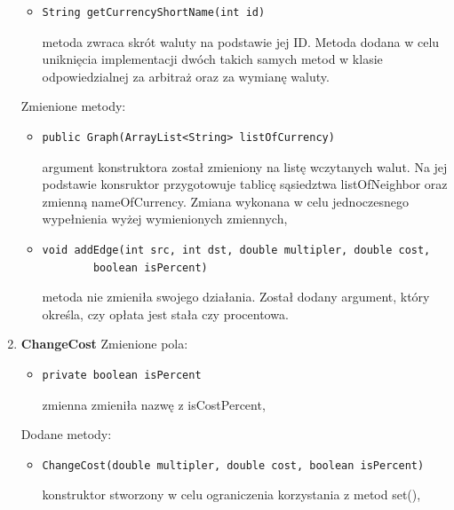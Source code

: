 \documentclass[12pt]{article}
\begin{document}
\begin{enumerate}
\begin{itemize}
    \end{itemize}
    \begin{itemize}
        \item \begin{verbatim}String getCurrencyShortName(int id)\end{verbatim}
        metoda zwraca skrót waluty na podstawie jej ID. Metoda dodana w celu uniknięcia implementacji dwóch takich samych metod w klasie odpowiedzialnej za arbitraż oraz za wymianę waluty.
    \end{itemize}
    Zmienione metody:
    \begin{itemize}
        \item \begin{verbatim}public Graph(ArrayList<String> listOfCurrency)\end{verbatim}
        argument konstruktora został zmieniony na listę wczytanych walut. Na jej podstawie konsruktor przygotowuje tablicę sąsiedztwa listOfNeighbor oraz zmienną nameOfCurrency. Zmiana wykonana w celu jednoczesnego wypełnienia wyżej wymienionych zmiennych,
    \end{itemize}
    \begin{itemize}
        \item \begin{verbatim}void addEdge(int src, int dst, double multipler, double cost,
        boolean isPercent)\end{verbatim}
        metoda nie zmieniła swojego działania. Został dodany argument, który określa, czy opłata jest stała czy procentowa.
    \end{itemize}
\item \textbf{ChangeCost}
\newline\newline
   Zmienione pola:
    \begin{itemize}
        \item \begin{verbatim}private boolean isPercent\end{verbatim}
        zmienna zmieniła nazwę z isCostPercent,
    \end{itemize}
    Dodane metody:
     \begin{itemize}
    \item \begin{verbatim}ChangeCost(double multipler, double cost, boolean isPercent)\end{verbatim}
        konstruktor stworzony w celu ograniczenia korzystania z metod set(),
    \end{itemize}

\end{enumerate}
\end{document}
